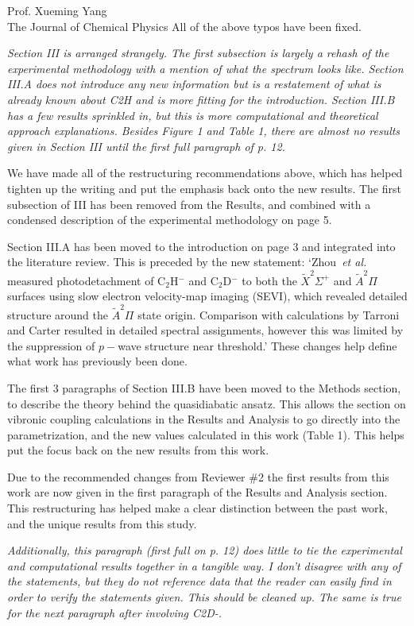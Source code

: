 \documentclass[a4paper,12pt]{letter}
\begin{document}
\begin{sf}
\begin{letter}{%
Prof. Xueming Yang\\
The Journal of Chemical Physics
}
All of the above typos have been fixed.

\emph{Section III is arranged strangely. The first subsection is largely a rehash of the experimental methodology with a mention of what the spectrum looks like. Section III.A does not introduce any new information but is a restatement of what is already known about C2H and is more fitting for the introduction. Section III.B has a few results sprinkled in, but this is more computational and theoretical approach explanations. Besides Figure 1 and Table 1, there are almost no results given in Section III until the first full paragraph of p. 12.}

We have made all of the restructuring recommendations above, which has helped tighten up the writing and put the emphasis back onto the new results. The first subsection of III has been removed from the Results, and combined with a condensed description of the experimental methodology on page 5. 

Section III.A has been moved to the introduction on page 3 and integrated into the literature review. This is preceded by the new statement: `Zhou~\emph{et al.} measured photodetachment of C$_2$H$^-$ and C$_2$D$^-$ to both the $\tilde{X} ^2\Sigma^+$ and $\tilde{A} ^2\Pi$ surfaces using slow electron velocity-map imaging (SEVI), which revealed detailed structure around the $\tilde{A} ^2\Pi$ state origin. Comparison with calculations by Tarroni and Carter resulted in detailed spectral assignments, however this was limited by the suppression of $p-$wave structure near threshold.' These changes help define what work has previously been done.

The first 3 paragraphs of Section III.B have been moved to the Methods section, to describe the theory behind the quasidiabatic ansatz. This allows the section on vibronic coupling calculations in the Results and Analysis to go directly into the parametrization, and the new values calculated in this work (Table 1). This helps put the focus back on the new results from this work. 

Due to the recommended changes from Reviewer \#2 the first results from this work are now given in the first paragraph of the Results and Analysis section. This restructuring has helped make a clear distinction between the past work, and the unique results from this study.

\emph{Additionally, this paragraph (first full on p. 12) does little to tie the experimental and computational results together in a tangible way. I don't disagree with any of the statements, but they do not reference data that the reader can easily find in order to verify the statements given. This should be cleaned up. The same is true for the next paragraph after involving C2D-.}


\end{letter}
\end{sf}
\end{document}
